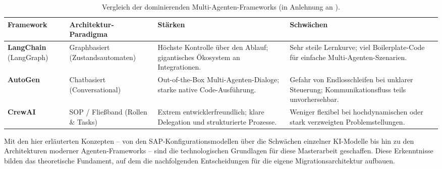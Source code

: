 \begin{table}[htbp]
    \centering
    \label{tab:framework_vergleich}
    \begin{tabularx}{\textwidth}{@{} 
        >{\raggedright\arraybackslash}p{2.5cm} 
        >{\raggedright\arraybackslash}p{3.5cm} 
        >{\raggedright\arraybackslash}X 
        >{\raggedright\arraybackslash}X @{}}
        \toprule
        \textbf{Framework} & \textbf{Architektur-Paradigma} & \textbf{Stärken} & \textbf{Schwächen} \\
        \midrule
        
        \textbf{LangChain} \newline (LangGraph) & 
        Graphbasiert \newline (Zustandsautomaten) & 
        Höchste Kontrolle über den Ablauf; gigantisches Ökosystem an Integrationen. & 
        Sehr steile Lernkurve; viel Boilerplate-Code für einfache Multi-Agenten-Szenarien. \\
        \addlinespace
        
        \textbf{AutoGen} & 
        Chatbasiert \newline (Conversational) & 
        Out-of-the-Box Multi-Agenten-Dialoge; starke native Code-Ausführung. & 
        Gefahr von Endlosschleifen bei unklarer Steuerung; Kommunikationsfluss teils unvorhersehbar. \\
        \addlinespace
        
        \textbf{CrewAI} & 
        SOP / Fließband \newline (Rollen \& Tasks) & 
        Extrem entwicklerfreundlich; klare Delegation und strukturierte Prozesse. & 
        Weniger flexibel bei hochdynamischen oder stark verzweigten Problemstellungen. \\
        
        \bottomrule
        \end{tabularx}
    \caption{Vergleich der dominierenden Multi-Agenten-Frameworks (in Anlehnung an \cite{liuLargescaleStudyDevelopment2025}).}
\end{table}

Mit den hier erläuterten Konzepten – von den SAP-Konfigurationsmodellen über die Schwächen einzelner KI-Modelle bis hin zu den Architekturen moderner Agenten-Frameworks – sind die technologischen Grundlagen für diese Masterarbeit geschaffen. Diese Erkenntnisse bilden das theoretische Fundament, auf dem die nachfolgenden Entscheidungen für die eigene Migrationsarchitektur aufbauen.